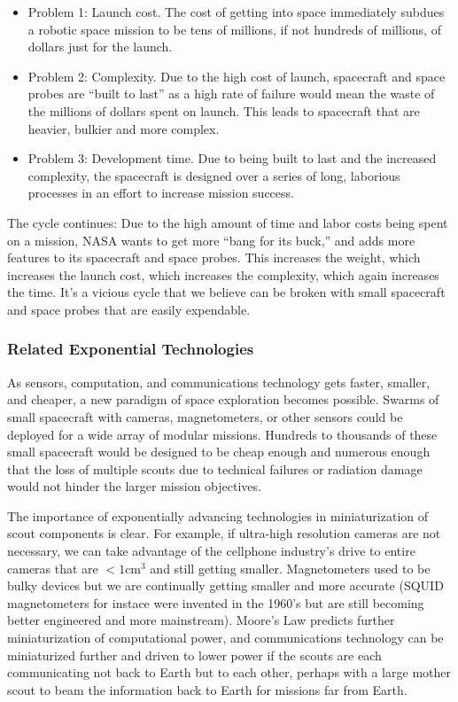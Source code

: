 \documentclass[letter,11pt]{article}
\begin{document}
\begin{itemize}
	\item Problem 1: Launch cost. The cost of getting into space immediately
		subdues a robotic space mission to be tens of millions, if not hundreds of
		millions, of dollars just for the launch.
	\item Problem 2: Complexity. Due to the high cost of launch, spacecraft and
		space probes are ``built to last'' as a high rate of failure would mean the
		waste of the millions of dollars spent on launch. This leads to spacecraft
		that are heavier, bulkier and more complex.
	\item Problem 3: Development time. Due to being built to last and the
		increased complexity, the spacecraft is designed over a series of long,
		laborious processes in an effort to increase mission success.
\end{itemize}

The cycle continues: Due to the high amount of time and labor costs being spent
on a mission, NASA wants to get more ``bang for its buck,'' and adds more
features to its spacecraft and space probes. This increases the weight, which
increases the launch cost, which increases the complexity, which again
increases the time. It's a vicious cycle that we believe can be broken with
small spacecraft and space probes that are easily expendable.

\subsubsection{Related Exponential Technologies}

As sensors, computation, and communications technology gets faster, smaller,
and cheaper, a new paradigm of space exploration becomes possible. Swarms of
small spacecraft with cameras, magnetometers, or other sensors could be
deployed for a wide array of modular missions. Hundreds to thousands of these
small spacecraft would be designed to be cheap enough and numerous enough that
the loss of multiple scouts due to technical failures or radiation damage
would not hinder the larger mission objectives. 

The importance of exponentially advancing technologies in miniaturization of
scout components is clear. For example, if ultra-high resolution cameras are
not necessary, we can take advantage of the cellphone industry's drive to
entire cameras that are $< 1 \mbox{cm}^3$ and still getting smaller.
Magnetometers used to be bulky devices but we are continually getting smaller
and more accurate (SQUID magnetometers for instace were invented in the 1960's
but are still becoming better engineered and more mainstream). Moore's Law
predicts further miniaturization of computational power, and communications
technology can be miniaturized further and driven to lower power if the scouts
are each communicating not back to Earth but to each other, perhaps with a
large mother scout to beam the information back to Earth for missions far from
Earth. 
\end{document}
